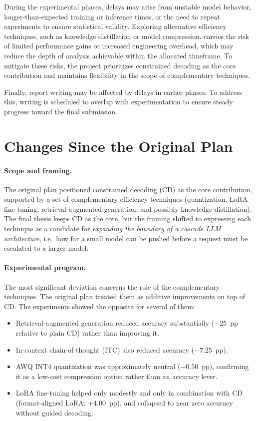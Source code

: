 During the experimental phases, delays may arise from unstable model behavior,
longer-than-expected training or inference times, or the need to repeat
experiments to ensure statistical validity. Exploring alternative efficiency
techniques, such as knowledge distillation or model compression, carries the
risk of limited performance gains or increased engineering overhead, which may
reduce the depth of analysis achievable within the allocated timeframe. To
mitigate these risks, the project prioritizes constrained decoding as the core
contribution and maintains flexibility in the scope of complementary techniques.

Finally, report writing may be affected by delays in earlier phases. To address
this, writing is scheduled to overlap with experimentation to ensure steady
progress toward the final submission.

\section{Changes Since the Original Plan}
\label{sec:plan-changes}

\paragraph{Scope and framing.}
The original plan positioned constrained decoding (CD) as the core
contribution, supported by a set of complementary efficiency techniques
(quantization, LoRA fine-tuning, retrieval-augmented generation, and
possibly knowledge distillation). The final thesis keeps CD as the core,
but the framing shifted to expressing each technique as a candidate for
\emph{expanding the boundary of a cascade LLM architecture}, i.e.\ how
far a small model can be pushed before a request must be escalated to a
larger model.

\paragraph{Experimental program.}
The most significant deviation concerns the role of the complementary
techniques. The original plan treated them as additive improvements on top
of CD. The experiments showed the opposite for several of them:

\begin{itemize}
  \item Retrieval-augmented generation reduced accuracy substantially
        ($-25$~pp relative to plain CD) rather than improving it.
  \item In-context chain-of-thought (ITC) also reduced accuracy
        ($-7.25$~pp).
  \item AWQ INT4 quantization was approximately neutral ($-0.50$~pp),
        confirming it as a low-cost compression option rather than an
        accuracy lever.
  \item LoRA fine-tuning helped only modestly and only in combination
        with CD (format-aligned LoRA: $+4.00$~pp), and collapsed to near
        zero accuracy without guided decoding.
\end{itemize}

